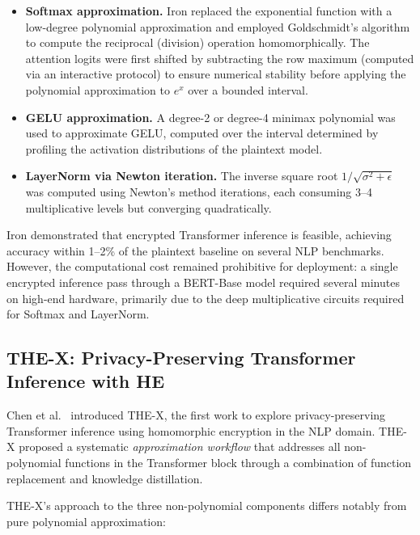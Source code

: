 \begin{itemize}
    \item \textbf{Softmax approximation.} Iron replaced the exponential function with a low-degree polynomial approximation and employed Goldschmidt's algorithm to compute the reciprocal (division) operation homomorphically. The attention logits were first shifted by subtracting the row maximum (computed via an interactive protocol) to ensure numerical stability before applying the polynomial approximation to $e^x$ over a bounded interval.
    \item \textbf{GELU approximation.} A degree-2 or degree-4 minimax polynomial was used to approximate GELU, computed over the interval determined by profiling the activation distributions of the plaintext model.
    \item \textbf{LayerNorm via Newton iteration.} The inverse square root $1/\sqrt{\sigma^2 + \epsilon}$ was computed using Newton's method iterations, each consuming 3--4 multiplicative levels but converging quadratically.
\end{itemize}

Iron demonstrated that encrypted Transformer inference is feasible, achieving accuracy within 1--2\% of the plaintext baseline on several NLP benchmarks. However, the computational cost remained prohibitive for deployment: a single encrypted inference pass through a BERT-Base model required several minutes on high-end hardware, primarily due to the deep multiplicative circuits required for Softmax and LayerNorm.

\subsection{THE-X: Privacy-Preserving Transformer Inference with HE}
\label{sec:thex}

Chen et al.~\cite{chen2022thex} introduced THE-X, the first work to explore privacy-preserving Transformer inference using homomorphic encryption in the NLP domain. THE-X proposed a systematic \emph{approximation workflow} that addresses all non-polynomial functions in the Transformer block through a combination of function replacement and knowledge distillation.

THE-X's approach to the three non-polynomial components differs notably from pure polynomial approximation:

